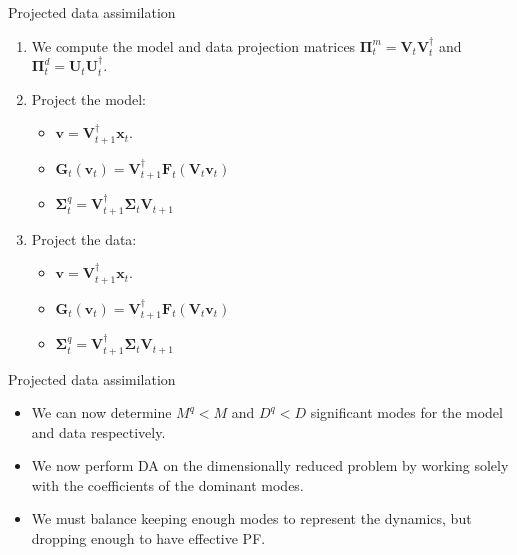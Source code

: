 \documentclass[aspectratio=169]{beamer}
\newcommand{\state}{\boldsymbol{x}}
\newcommand{\modelcovariance}{\boldsymbol{\Sigma}}
\newcommand{\modelf}{\boldsymbol{F}}
\newcommand{\projectedstate}{\boldsymbol{v}}
\begin{document}

\begin{frame}{Projected data assimilation}
\vfill
    \begin{enumerate}
    \pause
        \item We compute the model and data projection matrices $\boldsymbol{\Pi}_t^m = \boldsymbol{V}_t \boldsymbol{V}_t^\dagger$ and $\boldsymbol{\Pi}_t^d = \boldsymbol{U}_t \boldsymbol{U}_t^\dagger$.
    \pause
        \item Project the model:
        \begin{itemize}
            \item $\projectedstate=\boldsymbol{V}_{t+1}^\dagger \state_t$.
            \item $\boldsymbol{G}_t(\projectedstate_t) = \boldsymbol{V}_{t+1}^\dagger \modelf_t(\boldsymbol{V}_t \projectedstate_t)$
            \item $\modelcovariance^q_t = \boldsymbol{V}_{t+1}^\dagger \modelcovariance_t \boldsymbol{V}_{t+1}$
        \end{itemize}
    \pause
        \item Project the data:
        \begin{itemize}
            \item $\projectedstate=\boldsymbol{V}_{t+1}^\dagger \state_t$.
            \item $\boldsymbol{G}_t(\projectedstate_t) = \boldsymbol{V}_{t+1}^\dagger \modelf_t(\boldsymbol{V}_t \projectedstate_t)$
            \item $\modelcovariance^q_t = \boldsymbol{V}_{t+1}^\dagger \modelcovariance_t \boldsymbol{V}_{t+1}$
        \end{itemize}
\end{enumerate}
\vfill
\end{frame}


\begin{frame}{Projected data assimilation}
\vfill
    \begin{itemize}
    \pause
        \item We can now determine $M^q<M$ and $D^q<D$ significant modes for the model and data respectively.
    \pause
        \item We now perform DA on the dimensionally reduced problem by working solely with the coefficients of the dominant modes.
    \pause
        \item We must balance keeping enough modes to represent the dynamics, but dropping enough to have effective PF.
    \end{itemize}
\vfill
\end{frame}
\end{document}
